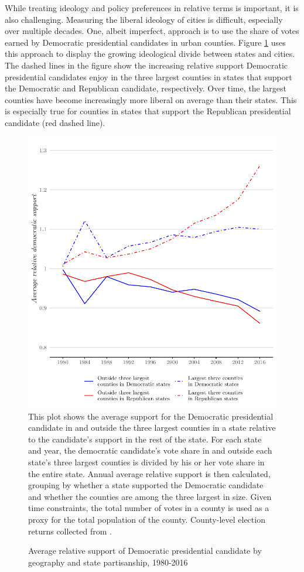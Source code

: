 \documentclass[12pt]{article}
\begin{document}
While treating ideology and policy preferences in relative terms is important, it is also challenging. Measuring the liberal ideology of cities is difficult, especially over multiple decades. One, albeit imperfect, approach is to use the share of votes earned by Democratic presidential candidates in urban counties. Figure \ref{fig:ideology} uses this approach to display the growing ideological divide between states and cities. The dashed lines in the figure show the increasing relative support Democratic presidential candidates enjoy in the three largest counties in states that support the Democratic and Republican candidate, respectively. Over time, the largest counties have become increasingly more liberal on average than their states. This is especially true for counties in states that support the Republican presidential candidate (red dashed line). 

\begin{figure}[!ht]
\caption{Average relative support of Democratic presidential candidate by geography and state partisanship, 1980-2016}
\label{fig:ideology}
\centering
\includegraphics[width=.75\textwidth]{plots/county_support}
\newline\scriptsize{This plot shows the average support for the Democratic presidential candidate in and outside the three largest counties in a state relative to the candidate's support in the rest of the state. For each state and year, the democratic candidate's vote share in and outside each state's three largest counties is divided by his or her vote share in the entire state. Annual average relative support is then calculated, grouping by whether a state supported the Democratic candidate and whether the counties are among the three largest in size. Given time constraints, the total number of votes in a county is used as a proxy for the total population of the county. County-level election returns collected from \textcite{cqpressCQVotingElections2019}.}
\end{figure}
\end{document}
